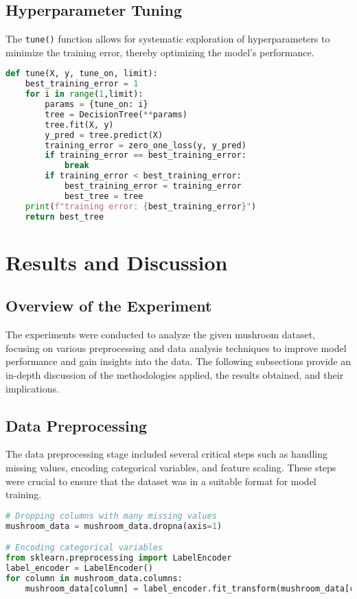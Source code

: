 \documentclass{article}
\begin{document}
\subsection{Hyperparameter Tuning}
The \texttt{tune()} function allows for systematic exploration of hyperparameters to minimize the training error, thereby optimizing the model's performance.

\begin{lstlisting}[language=Python, caption=Hyperparameter Tuning Function]
def tune(X, y, tune_on, limit):
    best_training_error = 1
    for i in range(1,limit):
        params = {tune_on: i}
        tree = DecisionTree(**params)
        tree.fit(X, y)
        y_pred = tree.predict(X)
        training_error = zero_one_loss(y, y_pred)
        if training_error == best_training_error:
            break
        if training_error < best_training_error:
            best_training_error = training_error
            best_tree = tree
    print(f"training error: {best_training_error}")
    return best_tree
\end{lstlisting}

\section{Results and Discussion}

\subsection{Overview of the Experiment}

The experiments were conducted to analyze the given mushroom dataset, focusing on various preprocessing and data analysis techniques to improve model performance and gain insights into the data. The following subsections provide an in-depth discussion of the methodologies applied, the results obtained, and their implications.

\subsection{Data Preprocessing}

The data preprocessing stage included several critical steps such as handling missing values, encoding categorical variables, and feature scaling. These steps were crucial to ensure that the dataset was in a suitable format for model training.

\begin{lstlisting}[language=Python, caption=Handling Missing Values, label=code:missing_values]
# Dropping columns with many missing values
mushroom_data = mushroom_data.dropna(axis=1)

# Encoding categorical variables
from sklearn.preprocessing import LabelEncoder
label_encoder = LabelEncoder()
for column in mushroom_data.columns:
    mushroom_data[column] = label_encoder.fit_transform(mushroom_data[column])
\end{lstlisting}
\end{document}
